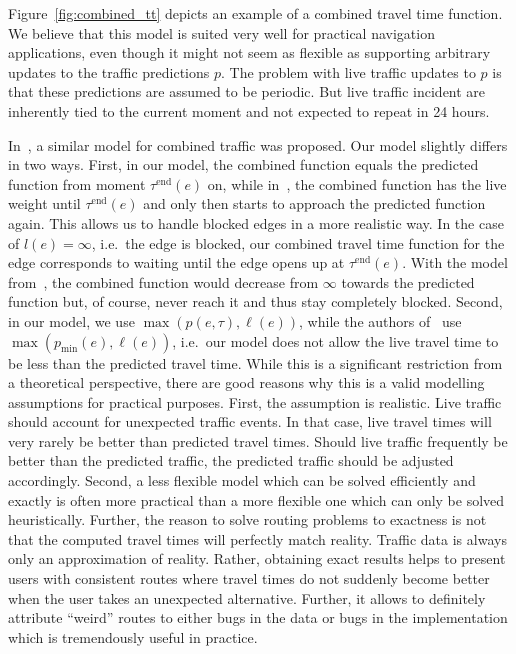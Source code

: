 \documentclass[a4paper,UKenglish,cleveref, autoref, thm-restate,anonymous]{lipics-v2021}
\newcommand*{\pred}{p}
\newcommand*{\live}{\ell}
\newcommand*{\tend}{\tau^{\operatorname{end}}}
\begin{document}
Figure~\ref{fig:combined_tt} depicts an example of a combined travel time function.
We believe that this model is suited very well for practical navigation applications, even though it might not seem as flexible as supporting arbitrary updates to the traffic predictions $\pred$.
The problem with live traffic updates to $\pred$ is that these predictions are assumed to be periodic.
But live traffic incident are inherently tied to the current moment and not expected to repeat in 24 hours.

In~\cite{strasser_et_al:LIPIcs.SEA.2021.6}, a similar model for combined traffic was proposed.
Our model slightly differs in two ways.
First, in our model, the combined function equals the predicted function from moment $\tend(e)$ on, while in~\cite{strasser_et_al:LIPIcs.SEA.2021.6}, the combined function has the live weight until $\tend(e)$ and only then starts to approach the predicted function again.
This allows us to handle blocked edges in a more realistic way.
In the case of $l(e) = \infty$, i.e.\ the edge is blocked, our combined travel time function for the edge corresponds to waiting until the edge opens up at $\tend(e)$.
With the model from~\cite{strasser_et_al:LIPIcs.SEA.2021.6}, the combined function would decrease from $\infty$ towards the predicted function but, of course, never reach it and thus stay completely blocked.
Second, in our model, we use $\max(p(e, \tau), \live(e))$, while the authors of~\cite{strasser_et_al:LIPIcs.SEA.2021.6} use $\max(p_{\min}(e), \live(e))$, i.e.\ our model does not allow the live travel time to be less than the predicted travel time.
While this is a significant restriction from a theoretical perspective, there are good reasons why this is a valid modelling assumptions for practical purposes.
First, the assumption is realistic.
Live traffic should account for unexpected traffic events.
In that case, live travel times will very rarely be better than predicted travel times.
Should live traffic frequently be better than the predicted traffic, the predicted traffic should be adjusted accordingly.
Second, a less flexible model which can be solved efficiently and exactly is often more practical than a more flexible one which can only be solved heuristically.
Further, the reason to solve routing problems to exactness is not that the computed travel times will perfectly match reality.
Traffic data is always only an approximation of reality.
Rather, obtaining exact results helps to present users with consistent routes where travel times do not suddenly become better when the user takes an unexpected alternative.
Further, it allows to definitely attribute ``weird'' routes to either bugs in the data or bugs in the implementation which is tremendously useful in practice.
\end{document}
